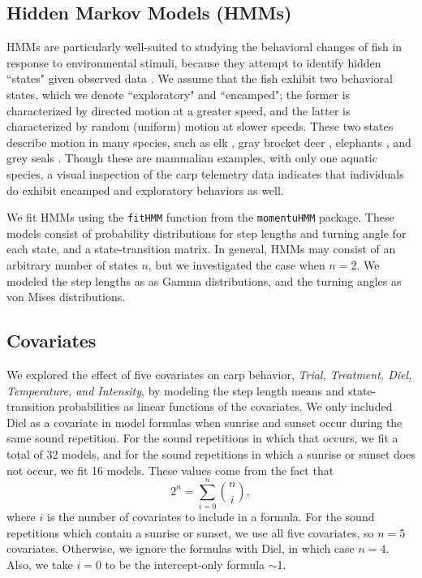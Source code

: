\documentclass[12pt]{article}
\begin{document}
	\subsection{Hidden Markov Models (HMMs)}
	
		HMMs are particularly well-suited to studying the behavioral changes of fish in response to environmental stimuli, because they attempt to identify hidden ``states" given observed data \cite{Rabiner1989}. We assume that the fish exhibit two behavioral states, which we denote ``exploratory" and ``encamped"; the former is characterized by directed motion at a greater speed, and the latter is characterized by random (uniform) motion at slower speeds. These two states describe motion in many species, such as elk \cite{Morales2004, Fryxell2008}, gray brocket deer \cite{Grotta-Neto2019}, elephants \cite{Roever2014, Vogel2019}, and grey seals \cite{Breed2009}. Though these are mammalian examples, with only one aquatic species, a visual inspection of the carp telemetry data indicates that individuals do exhibit encamped and exploratory behaviors as well.
		
		We fit HMMs using the \texttt{fitHMM} function from the \texttt{momentuHMM} package. These models consist of probability distributions for step lengths and turning angle for each state, and a state-transition matrix. In general, HMMs may consist of an arbitrary number of states $n$, but we investigated the case when $n = 2$. We modeled the step lengths as as Gamma distributions, and the turning angles as von Mises distributions.
	
	\subsection{Covariates}
	
		We explored the effect of five covariates on carp behavior, \emph{Trial, Treatment, Diel, Temperature, and Intensity}, by modeling the step length means and state-transition probabilities as linear functions of the covariates. We only included Diel as a covariate in model formulas when sunrise and sunset occur during the same sound repetition. For the sound repetitions in which that occurs, we fit a total of 32 models, and for the sound repetitions in which a sunrise or sunset does not occur, we fit 16 models. These values come from the fact that
		\[2^n = \sum_{i=0}^n {n \choose i},\]
		where $i$ is the number of covariates to include in a formula. For the sound repetitions which contain a sunrise or sunset, we use all five covariates, so $n = 5$ covariates. Otherwise, we ignore the formulas with Diel, in which case $n = 4$. Also, we take $i = 0$ to be the intercept-only formula $\sim$1.
		
\end{document}
